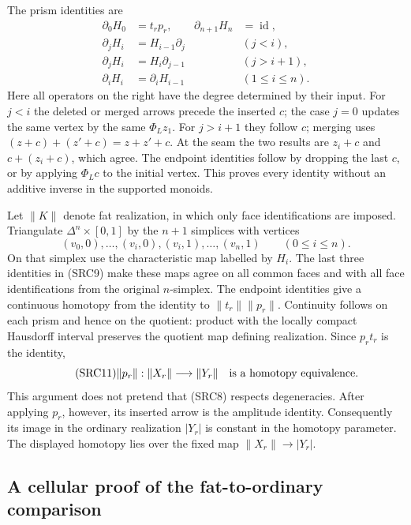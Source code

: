 The prism identities are
\begin{equation}\tag{SRC9}
\begin{aligned}
\partial_0H_0&=t_rp_r,&
\partial_{n+1}H_n&=\operatorname{id},\\
\partial_jH_i&=H_{i-1}\partial_j &&(j<i),\\
\partial_jH_i&=H_i\partial_{j-1} &&(j>i+1),\\
\partial_iH_i&=\partial_iH_{i-1} &&(1\le i\le n).
\end{aligned}
\end{equation}
Here all operators on the right have the degree determined by their
input. For $j<i$ the deleted or merged arrows precede the inserted
$c$; the case $j=0$ updates the same vertex by the same $\Phi_Lz_1$.
For $j>i+1$ they follow $c$; merging uses
$(z+c)+(z'+c)=z+z'+c$. At the seam the two results are
$z_i+c$ and $c+(z_i+c)$, which agree. The endpoint identities follow
by dropping the last $c$, or by applying $\Phi_Lc$ to the initial
vertex. This proves every identity without an additive inverse in
the supported monoids.

Let $\|K\|$ denote fat realization, in which only face identifications
are imposed. Triangulate $\Delta^n\times[0,1]$ by the $n+1$ simplices
with vertices
\begin{equation}\tag{SRC10}
(v_0,0),\ldots,(v_i,0),(v_i,1),\ldots,(v_n,1)
       \qquad(0\le i\le n).
\end{equation}
On that simplex use the characteristic map labelled by $H_i$.
The last three identities in (SRC9) make these maps agree on all
common faces and with all face identifications from the original
$n$-simplex. The endpoint identities give a continuous homotopy
from the identity to $\|t_r\|\|p_r\|$. Continuity follows on each
prism and hence on the quotient: product with the locally compact
Hausdorff interval preserves the quotient map defining realization.
Since $p_rt_r$ is the identity,
\begin{equation}\tag{SRC11}
\|p_r\|:\|X_r\|\longrightarrow\|Y_r\|
\quad\hbox{is a homotopy equivalence.}
\end{equation}
This argument does not pretend that (SRC8) respects degeneracies.
After applying $p_r$, however, its inserted arrow is the amplitude
identity. Consequently its image in the ordinary realization
$|Y_r|$ is constant in the homotopy parameter. The displayed
homotopy lies over the fixed map $\|X_r\|\to|Y_r|$.

\subsection{A cellular proof of the fat-to-ordinary comparison}

